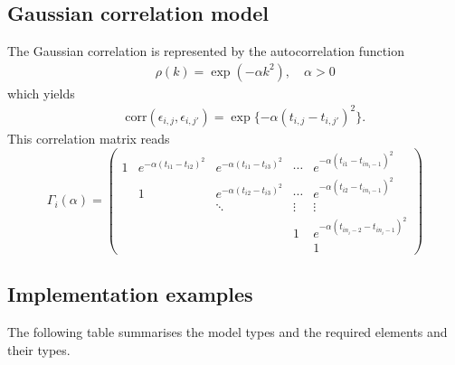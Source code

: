\subsection*{Gaussian correlation model}
The Gaussian correlation is represented by the autocorrelation function
\begin{eqnarray}
&&  \rho(k) = \exp(-\alpha k^2), \quad	\alpha > 0 \nonumber 
\end{eqnarray}
which yields
\begin{eqnarray}
&&  \text{corr}(\epsilon_{i,j},\epsilon_{i,j'}) = \exp\{-\alpha (t_{i,j} - t_{i,j'})^2\}. \nonumber
\end{eqnarray}
This correlation matrix reads %
\[
 \Gamma_i(\alpha) =
 \begin{pmatrix}
  	1 	& e^{-\alpha (t_{i1} - t_{i2})^2} 		& e^{-\alpha (t_{i1} - t_{i3})^2} 	& \cdots 	& e^{-\alpha (t_{i1} - t_{in_i-1})^2} \\
		& 1 							& e^{-\alpha (t_{i2} - t_{i3})^2} 	& \cdots 	& e^{-\alpha (t_{i2} - t_{in_i-1})^2} \\
		& 	 						& \ddots						& \vdots 	& \vdots \\
		& 	 						& 							& 1		& e^{-\alpha (t_{in_i-2} - t_{in_i-1})^2} \\
		& 							& 							& 		& 1 	
 \end{pmatrix}
\]


\subsection{Implementation examples}

The following table summarises the model types and the required elements
and their types.

